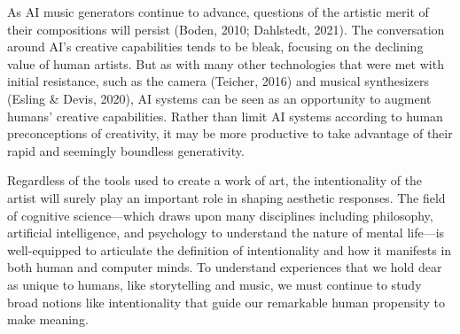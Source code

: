 \documentclass[12pt,twoside]{reedthesis}
\begin{document}
As AI music generators continue to advance, questions of the artistic merit of their compositions will persist (Boden, 2010; Dahlstedt, 2021). The conversation around AI’s creative capabilities tends to be bleak, focusing on the declining value of human artists. But as with many other technologies that were met with initial resistance, such as the camera (Teicher, 2016) and musical synthesizers (Esling \& Devis, 2020), AI systems can be seen as an opportunity to augment humans’ creative capabilities. Rather than limit AI systems according to human preconceptions of creativity, it may be more productive to take advantage of their rapid and seemingly boundless generativity. 

Regardless of the tools used to create a work of art, the intentionality of the artist will surely play an important role in shaping aesthetic responses. The field of cognitive science—which draws upon many disciplines including philosophy, artificial intelligence, and psychology to understand the nature of mental life—is well-equipped to articulate the definition of intentionality and how it manifests in both human and computer minds. To understand experiences that we hold dear as unique to humans, like storytelling and music, we must continue to study broad notions like intentionality that guide our remarkable human propensity to make meaning. 





  \backmatter %

    \nocite{*}


%  
 

\end{document}
